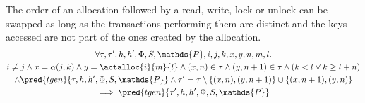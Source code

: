 \lem \label{lem:ax} The order of an allocation followed by a read, write, lock or unlock can be swapped as long as the transactions performing them are distinct and the keys accessed are not part of the ones created by the allocation.
\begin{gather*}
	\forall \tau, \tau', h, h', \Phi, S, \mathds{P}, i, j, k, x, y, n, m, l \ldotp \\
		i \neq j \land x = \alpha(j, k) \land y = \actalloc{i}{m}{l} \land (x, n) \in \tau \land (y, n+1) \in \tau \land (k < l \lor k \geq l + n) \\ \land \pred{tgen}{\tau, h, h', \Phi, S, \mathds{P}} \land \tau' = \tau \setminus \{(x, n), (y, n+1)\} \cup \{ (x, n+1), (y, n) \}
		\\	 
	 \implies \pred{tgen}{\tau', h, h', \Phi, S, \mathds{P}}
\end{gather*}
